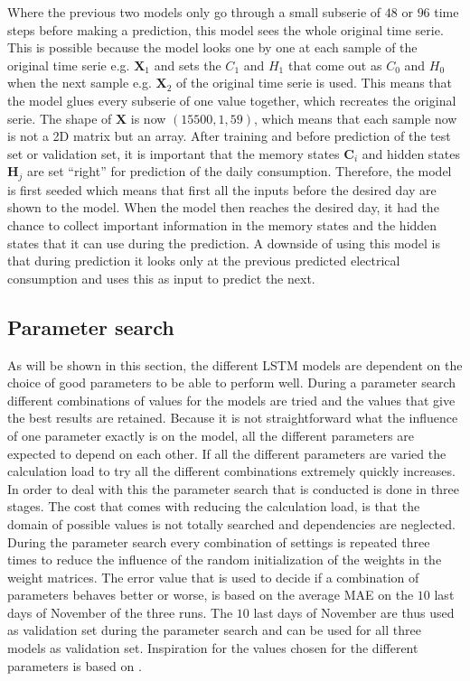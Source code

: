 Where the previous two models only go through a small subserie of $ 48 $ or $ 96 $ time steps before making a prediction, this model sees the whole original time serie. This is possible because the model looks one by one at each sample of the original time serie e.g. $ \bm{X}_{1} $ and sets the $ C_{1} $ and $ H_{1} $ that come out as $ C_{0} $ and $ H_{0} $ when the next sample e.g. $ \bm{X}_{2}  $ of the original time serie is used. This means that the model glues every subserie of one value together, which recreates the original serie. The shape of $ \bm{X} $ is now $ (15500, 1, 59) $, which means that each sample now is not a 2D matrix but an array. After training and before prediction of the test set or validation set, it is important that the memory states $ \bm{C}_{i} $  and hidden states $ \bm{H}_{j} $ are set ``right'' for prediction of the daily consumption. Therefore, the model is first seeded which means that first all the inputs before the desired day are shown to the model. When the model then reaches the desired day, it had the chance to collect important information in the memory states and the hidden states that it can use during the prediction. A downside of using this model is that during prediction it looks only at the previous predicted electrical consumption and uses this as input to predict the next.


\subsection{Parameter search}\label{s:Parameter search}
As will be shown in this section, the different LSTM models are dependent on the choice of good parameters to be able to perform well. During a parameter search different combinations of values for the models are tried and the values that give the best results are retained. Because it is not straightforward what the influence of one parameter exactly is on the model, all the different parameters are expected to depend on each other. If all the different parameters are varied the calculation load to try all the different combinations extremely quickly increases. In order to deal with this the parameter search that is conducted is done in three stages. The cost that comes with reducing the calculation load, is that the domain of possible values is not totally searched and dependencies are neglected. During the parameter search every combination of settings is repeated three times to reduce the influence of the random initialization of the weights in the weight matrices. The error value that is used to decide if a combination of parameters behaves better or worse, is based on the average MAE on the $ 10 $ last days of November of the three runs. The $ 10 $ last days of November are thus used as validation set during the parameter search and can be used for all three models as validation set. Inspiration for the values chosen for the different parameters is based on \cite{Shi2018}.

